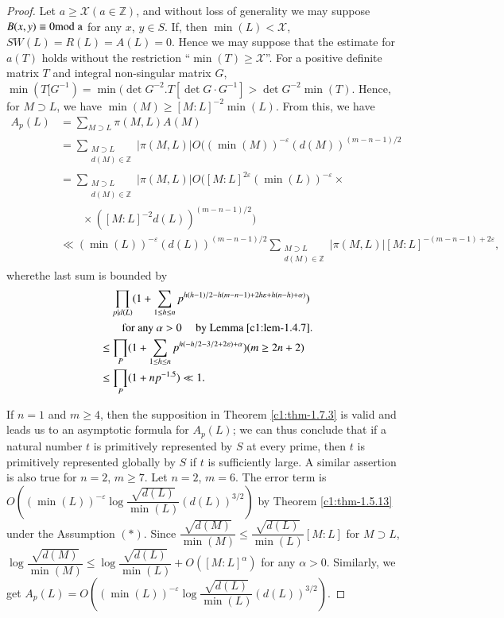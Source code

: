 \begin{proof}
Let $a\geq \mathscr{X}(a\in\mathbb{Z})$, and without loss of
generality we may suppose $B(x,y)\equiv 0\rm{mod} \; a$ for any $x$, $y\in
S$. If, then $\min (L)<\mathscr{X}$, $SW(L)=R(L)=A(L)=0$. Hence we may
suppose that the estimate for $a(T)$ holds without the restriction
``$\min (T)\geq \mathscr{X}$''. For a positive definite matrix $T$ and
integral non-singular matrix $G$, $\min (T[G^{-1})=\min (\det
  G^{-2}.T[\det G\cdot G^{-1}]>\det G^{-2}\min(T)$. Hence, for
  $M\supset L$, we have $\min(M)\geq [M:L]^{-2}\min(L)$. From this, we
  have
\begin{align*}
A_{p}(L) &= \sum_{M\supset L}\pi(M,L)A(M)\\
&= \sum_{\substack{M\supset L\\ d(M)\in\mathbb{Z}}}|\pi
(M,L)|O((\min(M))^{-\varepsilon}(d(M))^{(m-n-1)/2}\\
&= \sum_{\substack{M\supset
    L\\ d(M)\in\mathbb{Z}}}|\pi(M,L)|O([M:L]^{2\varepsilon}(\min
(L))^{-\varepsilon}\times\\
&\qquad \times ([M:L]^{-2}d(L))^{(m-n-1)/2})\\
&\ll (\min(L))^{-\varepsilon}(d(L))^{(m-n-1)/2}\sum_{\substack{M\supset
    L\\ d(M)\in\mathbb{Z}}}|\pi(M,L)|[M:L]^{-(m-n-1)+2\varepsilon},
\end{align*}
where\pageoriginale the last sum is bounded by
\begin{align*}
&\quad \prod_{p|d(L)}(1+\sum_{1\leq h\leq
    n}p^{h(h-1)/2-h(m-n-1)+2h\varepsilon+h(n-h)+\alpha)})\\
&\qquad \text{for any } \alpha>0 \quad \text{ by Lemma \ref{c1:lem-1.4.7}.}\\
&\leq \prod_{P}(1+\sum_{1\leq h\leq
    n}p^{h(-h/2-3/2+2\varepsilon)+\alpha})(m\geq 2n+2)\\
&\leq \prod_{P}(1+np^{-1.5})\ll 1.
\end{align*}

If $n=1$ and $m\geq 4$, then the supposition in Theorem
\ref{c1:thm-1.7.3} is valid and leads us to an asymptotic formula for
$A_{p}(L)$; we can thus conclude that if a natural number $t$ is
primitively represented by $S$ at every prime, then $t$ is primitively
represented globally by $S$ if $t$ is sufficiently large. A similar
assertion is also true for $n=2$, $m\geq 7$. Let $n=2$, $m=6$. The
error term is $O((\min
(L))^{-\varepsilon}\log\dfrac{\sqrt{d(L)}}{\min(L)}(d(L))^{3/2})$ by
Theorem \ref{c1:thm-1.5.13} under the Assumption $(\ast)$. Since
$\dfrac{\sqrt{d(M)}}{\min(M)}\leq \dfrac{\sqrt{d(L)}}{\min(L)}[M:L]$
for $M\supset L$, $\log\dfrac{\sqrt{d(M)}}{\min(M)}\leq
\log\dfrac{\sqrt{d(L)}}{\min(L)}+O([M:L]^{\alpha})$ for any
$\alpha>0$. Similarly, we get
$A_{p}(L)=O((\min(L))^{-\varepsilon}\log\dfrac{\sqrt{d(L)}}{\min(L)}(d(L))^{3/2})$. 

\end{proof}
